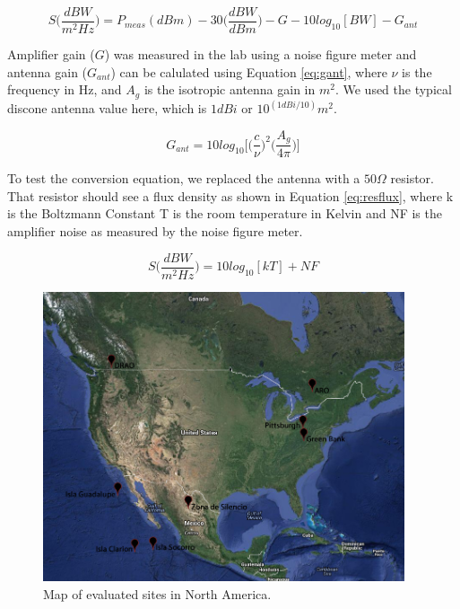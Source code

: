 \begin{equation}\label{eq:fluxdens}
S \Bigg( \frac{dBW}{m^2 Hz} \Bigg) = P_{meas} (dBm) - 30 \Bigg( \frac{dBW}{dBm} \Bigg) - G - 10log_{10} [BW] - G_{ant}
\end{equation}

Amplifier gain ($G$) was measured in the lab using a noise figure meter and antenna gain ($G_{ant}$) can be calulated using Equation \ref{eq:gant}, where $\nu$ is the frequency in Hz, and $A_g$ is the isotropic antenna gain in $m^2$. We used the typical discone antenna value here, which is $1 dBi$ or $10^(1dBi/10) m^2$. 

\begin{equation}\label{eq:gant}
G_{ant}= 10 log_{10} \Bigg[ \Bigg(\frac{c}{\nu} \Bigg)^2 \Bigg( \frac{A_g}{4 \pi} \Bigg) \Bigg]
\end{equation}

To test the conversion equation, we replaced the antenna with a $50 \Omega$ resistor. That resistor should see a flux density as shown in Equation \ref{eq:resflux}, where k is the Boltzmann Constant T is the room temperature in Kelvin and NF is the amplifier noise as measured by the noise figure meter. 

\begin{equation}\label{eq:resflux}
S \Bigg( \frac{dBW}{m^2 Hz} \Bigg) = 10 log_{10} [k T] + NF 
\end{equation}

\begin{figure}[tb]
\begin{center}
\includegraphics[width=0.95\textwidth]{RFI_testing/figures/large_scale_site_map.jpg}
\caption{Map of evaluated sites in North America.}
\label{Fig:site_map}
\end{center}
\end{figure}

